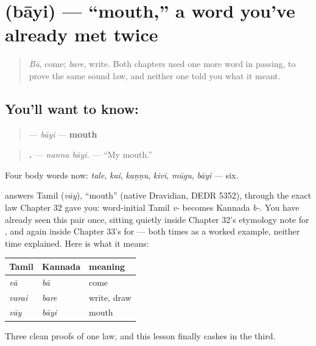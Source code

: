 \section[\texorpdfstring{\kn{ಬಾಯಿ} (bāyi)}{ಬಾಯಿ (bāyi)}]{ (bāyi) — \textquotedblleft{}mouth,\textquotedblright{} a word you've already met twice}

\label{lesson:KA-C37-baayi}



\begin{quote}
\emph{Bā}, come; \emph{bare}, write. Both chapters used one more word in passing, to prove the same sound law, and neither one told you what it meant.
\end{quote}

\subsection*{You'll want to know: }
\begin{quote}
\textbf{} — \emph{bāyi} — \textbf{mouth}
\end{quote}

\begin{quote}
\textbf{ .} — \emph{nanna bāyi.} — \textquotedblleft{}My mouth.\textquotedblright{}
\end{quote}

Four body words now: \emph{tale}, \emph{kai}, \emph{kaṇṇu}, \emph{kivi}, \emph{mūgu}, \emph{bāyi} — six.

\begin{cousinweb}
\textbf{} answers Tamil \textbf{} (\emph{vāy}), \textquotedblleft{}mouth\textquotedblright{} (native Dravidian, DEDR 5352), through the exact law Chapter 32 gave you: word-initial Tamil \emph{v-} becomes Kannada \emph{b-}. You have already seen this pair once, sitting quietly inside Chapter 32's etymology note for \textbf{}, and again inside Chapter 33's for \textbf{} — both times as a worked example, neither time explained. Here is what it means:

\noindent
\begin{tabularx}{\linewidth}{@{}>{\raggedright\arraybackslash}X>{\raggedright\arraybackslash}X>{\raggedright\arraybackslash}X@{}}
\toprule
\textbf{Tamil} & \textbf{Kannada} & \textbf{meaning} \\
\midrule
\emph{vā} & \emph{bā} & come \\
\emph{varai} & \emph{bare} & write, draw \\
\emph{vāy} & \emph{bāyi} & mouth \\
\bottomrule
\end{tabularx}

Three clean proofs of one law, and this lesson finally cashes in the third.
\end{cousinweb}

